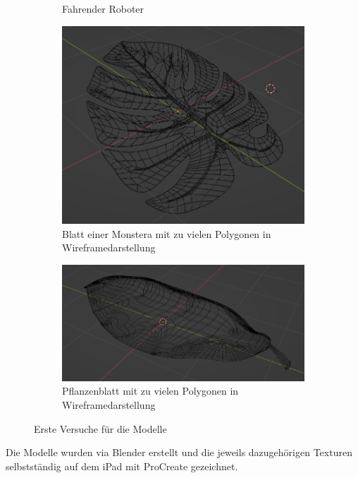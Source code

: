 \begin{figure}[H]
\begin{subfigure}{0.5\textwidth}
		\caption{Fahrender Roboter}
	\end{subfigure}	
	\begin{subfigure}{0.5\textwidth}
		\centering
		\includegraphics[height=0.3\pageheight,keepaspectratio]{pics/8} 
		\caption{Blatt einer Monstera mit zu vielen Polygonen in Wireframedarstellung}
	\end{subfigure}	
	\begin{subfigure}{0.5\textwidth}
		\centering
		\includegraphics[height=0.3\pageheight,keepaspectratio]{pics/9} 
		\caption{Pflanzenblatt mit zu vielen Polygonen in Wireframedarstellung}
	\end{subfigure}	
	\caption{Erste Versuche für die Modelle}
\end{figure}
\par
Die Modelle wurden via Blender erstellt und die jeweils dazugehörigen Texturen selbstständig auf dem iPad mit ProCreate gezeichnet. 
\par
